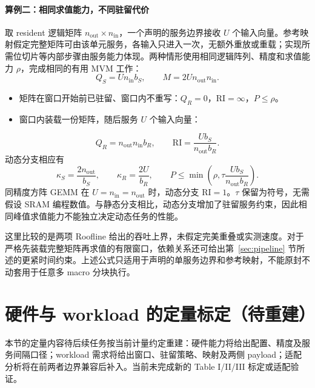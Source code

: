 \documentclass[11pt, a4paper]{ctexart}
\theoremstyle{definition}
\newcommand{\RI}{\mathrm{RI}}
\begin{document}
\paragraph{算例二：相同求值能力，不同驻留代价}
\label{para:resident_example}
取 resident 逻辑矩阵 $n_{\mathrm{out}}\times n_{\mathrm{in}}$，一个声明的服务边界接收 $U$ 个输入向量。参考映射假定完整矩阵可由该单元服务，各输入只进入一次，无额外重放或重载；实现所需位切片等内部步骤由服务能力体现。两种情形使用相同逻辑阵列、精度和求值能力 $\rho$，完成相同的有用 MVM 工作：
\begin{equation}
Q_S=U n_{\mathrm{in}}b_S,\qquad M=2U n_{\mathrm{out}}n_{\mathrm{in}}.
\label{eq:rect_work}
\end{equation}
\begin{itemize}[topsep=2pt,itemsep=2pt]
\item 矩阵在窗口开始前已驻留、窗口内不重写：$Q_R=0$，$\RI=\infty$，$P\le\rho$。
\item 窗口内装载一份矩阵，随后服务 $U$ 个输入向量：
\end{itemize}
\begin{equation}
Q_R=n_{\mathrm{out}}n_{\mathrm{in}}b_R,\qquad
\RI=\frac{U b_S}{n_{\mathrm{out}}b_R}.
\label{eq:rect_resident}
\end{equation}
动态分支相应有
\[
\kappa_S=\frac{2n_{\mathrm{out}}}{b_S},\qquad
\kappa_R=\frac{2U}{b_R},\qquad
P\le\min\!\left(\rho,\tau\frac{U b_S}{n_{\mathrm{out}}b_R}\right).
\]
同精度方阵 GEMM 在 $U=n_{\mathrm{in}}=n_{\mathrm{out}}$ 时，动态分支 $\RI=1$。$\tau$ 保留为符号，无需假设 SRAM 编程数值。与静态分支相比，动态分支增加了驻留服务约束，因此相同峰值求值能力不能独立决定动态任务的性能。

这里比较的是两项 Roofline 给出的吞吐上界，未假定完美重叠或实测速度。对于严格先装载完整矩阵再求值的有限窗口，依赖关系还可给出第~\ref{sec:pipeline} 节所述的更紧时间约束。上述公式只适用于声明的单服务边界和参考映射，不能原封不动套用于任意多 macro 分块执行。

\section{硬件与 workload 的定量标定（待重建）}
\label{sec:quantitative}

本节的定量内容待后续任务按当前计量约定重建：硬件能力将给出配置、精度及服务间隔口径；workload 需求将给出窗口、驻留策略、映射及两侧 payload；适配分析将在前两者边界兼容后补入。当前未完成新的 Table I/II/III 标定或适配验证。
\end{document}
